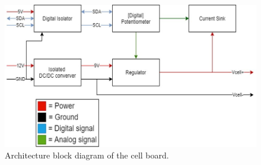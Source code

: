     \begin{figure}[h]
        \centering
        \includegraphics[scale=0.47]{architecture_single_cell.png}
        \caption{Architecture block diagram of the cell board.}
        \label{fig:2nd_architecture_cell}
    \end{figure}

